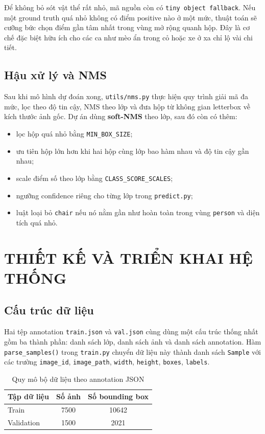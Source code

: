 \documentclass[12pt,a4paper]{article}
\begin{document}
Để không bỏ sót vật thể rất nhỏ, mã nguồn còn có \texttt{tiny object fallback}. Nếu một ground truth quá nhỏ không có điểm positive nào ở một mức, thuật toán sẽ cưỡng bức chọn điểm gần tâm nhất trong vùng mở rộng quanh hộp. Đây là cơ chế đặc biệt hữu ích cho các ca như mèo ẩn trong cỏ hoặc xe ở xa chỉ lộ vài chi tiết.

\subsection{Hậu xử lý và NMS}
Sau khi mô hình dự đoán xong, \texttt{utils/nms.py} thực hiện quy trình giải mã đa mức, lọc theo độ tin cậy, NMS theo lớp và đưa hộp từ không gian letterbox về kích thước ảnh gốc. Dự án dùng \textbf{soft-NMS} theo lớp, sau đó còn có thêm:
\begin{itemize}
    \item lọc hộp quá nhỏ bằng \texttt{MIN\_BOX\_SIZE};
    \item ưu tiên hộp lớn hơn khi hai hộp cùng lớp bao hàm nhau và độ tin cậy gần nhau;
    \item scale điểm số theo lớp bằng \texttt{CLASS\_SCORE\_SCALES};
    \item ngưỡng confidence riêng cho từng lớp trong \texttt{predict.py};
    \item luật loại bỏ \texttt{chair} nếu nó nằm gần như hoàn toàn trong vùng \texttt{person} và diện tích quá nhỏ.
\end{itemize}

\section{THIẾT KẾ VÀ TRIỂN KHAI HỆ THỐNG}

\subsection{Cấu trúc dữ liệu}
Hai tệp annotation \texttt{train.json} và \texttt{val.json} cùng dùng một cấu trúc thống nhất gồm ba thành phần: danh sách lớp, danh sách ảnh và danh sách annotation. Hàm \texttt{parse\_samples()} trong \texttt{train.py} chuyển dữ liệu này thành danh sách \texttt{Sample} với các trường \texttt{image\_id}, \texttt{image\_path}, \texttt{width}, \texttt{height}, \texttt{boxes}, \texttt{labels}.

\begin{table}[H]
\centering
\caption{Quy mô bộ dữ liệu theo annotation JSON}
\label{tab:dataset-overview}
\begin{tabular}{lcc}
\toprule
Tập dữ liệu & Số ảnh & Số bounding box \\
\midrule
Train & 7500 & 10642 \\
Validation & 1500 & 2021 \\
\bottomrule
\end{tabular}
\end{table}
\end{document}
